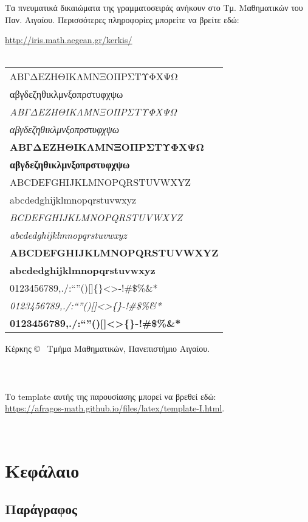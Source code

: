 {\large {\flushleft Τα} πνευματικά δικαιώματα της γραμματοσειράς ανήκουν στο Τμ. Μαθηματικών του Παν. Αιγαίου. Περισσότερες πληροφορίες μπορείτε να βρείτε εδώ:
\begin{center}
\href{http://iris.math.aegean.gr/kerkis/}{http://iris.math.aegean.gr/kerkis/}\\~\\
\begin{tabular}{l}
\hline
ΑΒΓΔΕΖΗΘΙΚΛΜΝΞΟΠΡΣΤΥΦΧΨΩ\\
αβγδεζηθικλμνξοπρστυφχψω\\
\emph{ΑΒΓΔΕΖΗΘΙΚΛΜΝΞΟΠΡΣΤΥΦΧΨΩ}\\
\emph{αβγδεζηθικλμνξοπρστυφχψω}\\
\textbf{ΑΒΓΔΕΖΗΘΙΚΛΜΝΞΟΠΡΣΤΥΦΧΨΩ}\\
\textbf{αβγδεζηθικλμνξοπρστυφχψω}\\
ABCDEFGHIJKLMNOPQRSTUVWXYZ\\
abcdedghijklmnopqrstuvwxyz\\
\emph{BCDEFGHIJKLMNOPQRSTUVWXYZ}\\
\emph{abcdedghijklmnopqrstuvwxyz}\\
\textbf{ABCDEFGHIJKLMNOPQRSTUVWXYZ}\\
\textbf{abcdedghijklmnopqrstuvwxyz}\\
0123456789,./:``''()[]\{\}<>-!\@\#\$\%\&*\\
\emph{0123456789,./:``''()[]<>\{\}-!\@\#\$\%\&*}\\
\textbf{0123456789,./:``''()[]<>\{\}-!\@\#\$\%\&*}\\
\hline
\end{tabular}
\end{center}
Κέρκης \copyright~ Τμήμα Μαθηματικών, Πανεπιστήμιο Αιγαίου.\\ \\ \\ \\
Το template αυτής της παρουσίασης μπορεί να βρεθεί εδώ:\\ \href{https://afragos-math.github.io/files/latex/template-I.html}{https://afragos-math.github.io/files/latex/template-I.html}.}

\vfill~
\newpage

\tableofcontents

\chapter{Κεφάλαιο}
\section{Παράγραφος}
